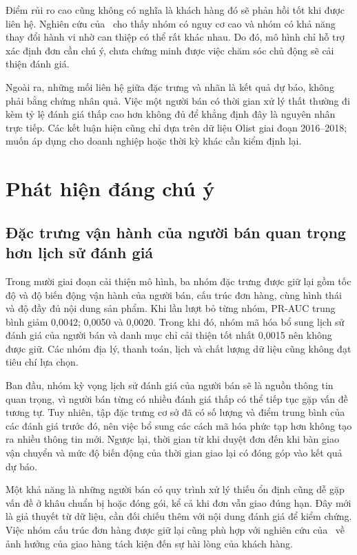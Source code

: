 \documentclass[12pt,a4paper]{report}
\begin{document}
Điểm rủi ro cao cũng không có nghĩa là khách hàng đó sẽ phản hồi tốt khi được liên hệ. Nghiên cứu của~\textcite{ascarza2018} cho thấy nhóm có nguy cơ cao và nhóm có khả năng thay đổi hành vi nhờ can thiệp có thể rất khác nhau. Do đó, mô hình chỉ hỗ trợ xác định đơn cần chú ý, chưa chứng minh được việc chăm sóc chủ động sẽ cải thiện đánh giá.

Ngoài ra, những mối liên hệ giữa đặc trưng và nhãn là kết quả dự báo, không phải bằng chứng nhân quả. Việc một người bán có thời gian xử lý thất thường đi kèm tỷ lệ đánh giá thấp cao hơn không đủ để khẳng định đây là nguyên nhân trực tiếp. Các kết luận hiện cũng chỉ dựa trên dữ liệu Olist giai đoạn 2016--2018; muốn áp dụng cho doanh nghiệp hoặc thời kỳ khác cần kiểm định lại.

\section{Phát hiện đáng chú ý}\label{sec:disc-findings}

\subsection{Đặc trưng vận hành của người bán quan trọng hơn lịch sử đánh giá}

Trong mười giai đoạn cải thiện mô hình, ba nhóm đặc trưng được giữ lại gồm tốc độ và độ biến động vận hành của người bán, cấu trúc đơn hàng, cùng hình thái và độ đầy đủ nội dung sản phẩm. Khi lần lượt bỏ từng nhóm, PR-AUC trung bình giảm 0,0042; 0,0050 và 0,0020. Trong khi đó, nhóm mã hóa bổ sung lịch sử đánh giá của người bán và danh mục chỉ cải thiện tốt nhất 0,0015 nên không được giữ. Các nhóm địa lý, thanh toán, lịch và chất lượng dữ liệu cũng không đạt tiêu chí lựa chọn.

Ban đầu, nhóm kỳ vọng lịch sử đánh giá của người bán sẽ là nguồn thông tin quan trọng, vì người bán từng có nhiều đánh giá thấp có thể tiếp tục gặp vấn đề tương tự. Tuy nhiên, tập đặc trưng cơ sở đã có số lượng và điểm trung bình của các đánh giá trước đó, nên việc bổ sung các cách mã hóa phức tạp hơn không tạo ra nhiều thông tin mới. Ngược lại, thời gian từ khi duyệt đơn đến khi bàn giao vận chuyển và mức độ biến động của thời gian giao lại có đóng góp vào kết quả dự báo.

Một khả năng là những người bán có quy trình xử lý thiếu ổn định cũng dễ gặp vấn đề ở khâu chuẩn bị hoặc đóng gói, kể cả khi đơn vẫn giao đúng hạn. Đây mới là giả thuyết từ dữ liệu, cần đối chiếu thêm với nội dung đánh giá để kiểm chứng. Việc nhóm cấu trúc đơn hàng được giữ lại cũng phù hợp với nghiên cứu của~\textcite{brylla2022} về ảnh hưởng của giao hàng tách kiện đến sự hài lòng của khách hàng.
\end{document}
